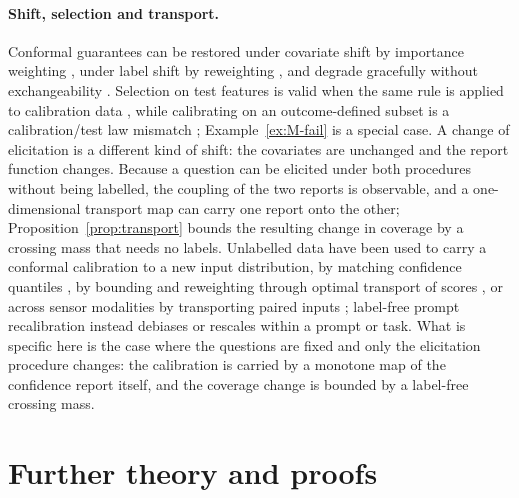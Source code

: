 \documentclass[twoside]{article}
\theoremstyle{definition}
\theoremstyle{remark}
\newcommand{\1}{\mathbf{1}}
\begin{document}
\paragraph{Shift, selection and transport.} Conformal guarantees can be restored under covariate shift
by importance weighting \citep{tibshirani2019conformal}, under label shift by reweighting
\citep{podkopaev2021distribution}, and degrade gracefully without exchangeability
\citep{barber2023beyond}. Selection on test features is valid when the same rule is applied to
calibration data \citep{bao2024selective,jin2024confidence}, while calibrating on an outcome-defined
subset is a calibration/test law mismatch \citep{wang2026trimming}; Example~\ref{ex:M-fail} is a
special case. A change of elicitation is a different kind of shift: the covariates are unchanged and
the report function changes. Because a question can be elicited under both procedures without being
labelled, the coupling of the two reports is observable, and a one-dimensional transport map
\citep{peyre2019computational,santambrogio2015optimal} can carry one report onto the other;
Proposition~\ref{prop:transport} bounds the resulting change in coverage by a crossing mass that needs
no labels. Unlabelled data have been used to carry a conformal calibration to a new input distribution,
by matching confidence quantiles \citep{yilmaz2022testtime}, by bounding and reweighting through
optimal transport of scores \citep{correia2025nonexchangeable}, or across sensor modalities by
transporting paired inputs \citep{doula2026conformal}; label-free prompt recalibration
\citep{zhao2021calibrate,zhou2024batch,shen2024thermometer} instead debiases or rescales within a prompt
or task. What is specific here is the case where the questions are fixed and only the elicitation
procedure changes: the calibration is carried by a monotone map of the confidence report itself, and
the coverage change is bounded by a label-free crossing mass.

\section{Further theory and proofs}
\label{app:theory}
\end{document}
